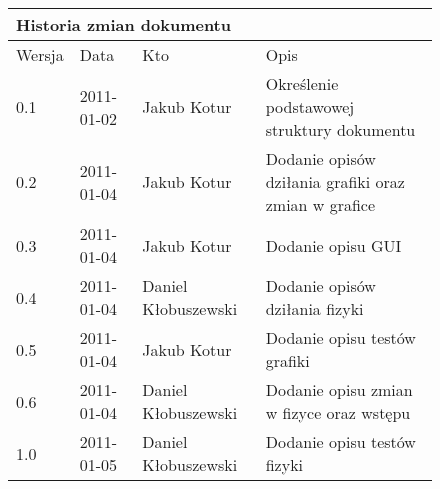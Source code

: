 \begin{figure}[h]
	\centering

\begin{tabular}{|p{}|p{}|p{}|p{}|}
	\hline
	\multicolumn{4}{|l|}{Historia zmian dokumentu} \\
	\hline
	Wersja & Data & Kto & Opis \\
	\hline
	0.1 & 2011-01-02 & Jakub Kotur &
	Określenie podstawowej struktury dokumentu \\
	\hline
	0.2 & 2011-01-04 & Jakub Kotur &
	Dodanie opisów dziłania grafiki oraz zmian w grafice \\
	\hline
	0.3 & 2011-01-04 & Jakub Kotur &
	Dodanie opisu GUI \\
	\hline
	0.4 & 2011-01-04 & Daniel Kłobuszewski &
	Dodanie opisów dziłania fizyki \\
	\hline
	0.5 & 2011-01-04 & Jakub Kotur &
	Dodanie opisu testów grafiki \\
	\hline
	0.6 & 2011-01-04 & Daniel Kłobuszewski &
	Dodanie opisu zmian w fizyce oraz wstępu \\
	\hline
	1.0 & 2011-01-05 & Daniel Kłobuszewski &
	Dodanie opisu testów fizyki \\
	\hline
\end{tabular}

	\label{tab:hist}
\end{figure}

